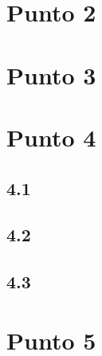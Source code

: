 \documentclass[aps,prl,reprint,rmp]{revtex4-1}
\begin{document}
\section{Punto 2}




\section{Punto 3}




\section{Punto 4}

\subsection{4.1}

\subsection{4.2}

\subsection{4.3}




\section{Punto 5}
\end{document}
